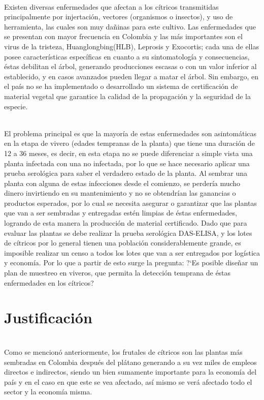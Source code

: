 ~\\Existen diversas enfermedades que afectan a los c\'{i}tricos transmitidas principalmente por injertaci\'{o}n, vectores (organismos o insectos), y uso de herramienta, las cuales son muy da\~{n}inas para este cultivo. Las enfermedades que se presentan con mayor frecuencia en Colombia y las m\'{a}s importantes son el virus de la tristeza, Huanglongbing(HLB), Leprosis y Exocortis; cada una de ellas posee caracter\'{i}sticas espec\'{i}ficas en cuanto a su sintomatolog\'{i}a y consecuencias, \'{e}stas debilitan el \'{a}rbol, generando producciones escasas o con un valor inferior al establecido, y en casos avanzados pueden llegar a matar el \'{a}rbol. Sin embargo, en el pa\'{i}s no se ha implementado o desarrollado un sistema de certificaci\'{o}n de material vegetal que garantice la calidad de la propagaci\'{o}n y la seguridad de la especie.

~\\El problema principal es que la mayor\'{i}a de estas enfermedades son asintom\'{a}ticas en la etapa de vivero (edades tempranas de la planta) que tiene una duraci\'{o}n de 12 a 36 meses, es decir, en esta etapa no se puede diferenciar a simple vista una planta infectada con una no infectada, por lo que se hace necesario aplicar una prueba serol\'{o}gica para saber el verdadero estado de la planta. Al sembrar una planta con alguna de estas infecciones desde el comienzo, se perder\'{i}a mucho dinero invirtiendo en su mantenimiento y no se obtendr\'{i}an las ganancias o productos esperados, por lo cual se necesita asegurar o garantizar que las plantas que van a ser sembradas y entregadas est\'{e}n limpias de \'{e}stas enfermedades, logrando de esta manera la producci\'{o}n de material certificado. Dado que para evaluar las plantas se debe realizar la prueba serol\'{o}gica DAS-ELISA, y los lotes de c\'{i}tricos por lo general tienen una poblaci\'{o}n considerablemente grande, es imposible realizar un censo a todos los lotes que van a ser entregados por log\'{i}stica y econom\'{i}a. Por lo que a partir de esto surge la pregunta: ?`Es posible dise\~{n}ar un plan de muestreo en viveros, que permita la detecci\'{o}n temprana de \'{e}stas enfermedades en los c\'{i}tricos?


\section{Justificaci\'{o}n}
~\\Como se mencion\'{o} anteriormente, los frutales de c\'{i}tricos son las plantas m\'{a}s sembradas en Colombia despu\'{e}s del pl\'{a}tano generando a su vez miles de empleos directos e indirectos, siendo un bien sumamente importante para la econom\'{i}a del pa\'{i}s y en el caso en que este se vea afectado, as\'{i} mismo se ver\'{a} afectado todo el sector y la econom\'{i}a misma. 

